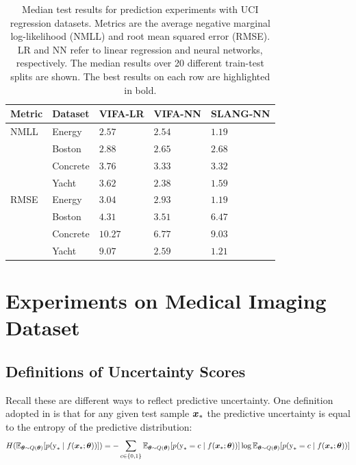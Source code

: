 \documentclass[10pt]{article} %
\begin{document}
\begin{table}[!h]
\caption{Median test results for prediction experiments with UCI regression datasets. Metrics are the average negative marginal log-likelihood (NMLL) and root mean squared error (RMSE). LR and NN refer to linear regression and neural networks, respectively. The median results over 20 different train-test splits are shown. The best results on each row are highlighted in bold.}
\label{table:neural_nets_uci_median}
\begin{center}
\begin{tabular}{l|llll}
\textbf{Metric} & \textbf{Dataset} & \textbf{VIFA-LR} & \textbf{VIFA-NN} & \textbf{SLANG-NN} \\ \hline
NMLL 	& Energy 		& $2.57$ 					& $2.54$ 					& $\mathbf{1.19}$ \\ 	
		& Boston   	& $2.88$	 				& $\mathbf{2.65}$ 			& $2.68$ \\ 			
		& Concrete	& $3.76$ 					& $3.33$ 					& $\mathbf{3.32}$ \\ 			
 	& Yacht    		& $3.62$ 					& $2.38$ 					& $\mathbf{1.59}$ \\ \hline
RMSE 	& Energy 	 	& $3.04$ 					& $2.93$ 					& $\mathbf{1.19}$ \\ 
		& Boston 	 	& $4.31$ 					& $\mathbf{3.51}$ 			& $6.47$ \\ 
		& Concrete  	& $10.27$ 				& $\mathbf{6.77}$ 			& $9.03$ \\ 
 	& Yacht 		& $9.07$ 					& $2.59$ 					& $\mathbf{1.21}$ \\ 
\end{tabular}
\end{center}
\end{table}

\section{Experiments on Medical Imaging Dataset}
\subsection{Definitions of Uncertainty Scores}\label{app:uncertainty_scores_defs}
Recall these are different ways to reflect predictive uncertainty. One definition adopted in \citet{band2022benchmarking} is that for any given test sample ${\bm{x}}_*$ the predictive uncertainty is equal to the entropy of the predictive distribution: 
\begin{equation}
H(\mathbb{E}_{{\bm{\theta}} \sim Q({\bm{\theta}})}[p({\textnormal{y}}_* \mid f({\bm{x}}_* ; {\bm{\theta}}))])=-\sum_{c \in\{0,1\}} \mathbb{E}_{{\bm{\theta}} \sim Q({\bm{\theta}})}[p({\textnormal{y}}_*=c \mid f({\bm{x}}_* ; {\bm{\theta}}))] \log \mathbb{E}_{{\bm{\theta}} \sim Q({\bm{\theta}})} [p({\textnormal{y}}_*=c \mid f({\bm{x}}_* ; {\bm{\theta}}))]
\end{equation}
\end{document}
